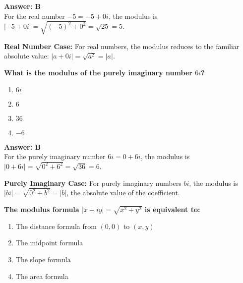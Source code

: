 \documentclass[12pt,a4paper]{article}
\begin{document}
\begin{answerstyle}
\textbf{Answer: B} \\
For the real number \( -5 = -5 + 0i \), the modulus is \( |-5 + 0i| = \sqrt{(-5)^2 + 0^2} = \sqrt{25} = 5 \).
\end{answerstyle}

\begin{conceptbox}
\textbf{Real Number Case:} For real numbers, the modulus reduces to the familiar absolute value: \( |a + 0i| = \sqrt{a^2} = |a| \).
\end{conceptbox}

\newpage
\begin{questiontitle}[MCQ 93]
\textbf{What is the modulus of the purely imaginary number \( 6i \)?}
\end{questiontitle}

\begin{partbox}[Options]
\begin{enumerate}[label=\Alph*.]
    \item \( 6i \)
    \item \( 6 \)
    \item \( 36 \)
    \item \( -6 \)
\end{enumerate}
\end{partbox}

\begin{answerstyle}
\textbf{Answer: B} \\
For the purely imaginary number \( 6i = 0 + 6i \), the modulus is \( |0 + 6i| = \sqrt{0^2 + 6^2} = \sqrt{36} = 6 \).
\end{answerstyle}

\begin{conceptbox}
\textbf{Purely Imaginary Case:} For purely imaginary numbers \( bi \), the modulus is \( |bi| = \sqrt{0^2 + b^2} = |b| \), the absolute value of the coefficient.
\end{conceptbox}

\newpage
\begin{questiontitle}[MCQ 94]
\textbf{The modulus formula \( |x + iy| = \sqrt{x^2 + y^2} \) is equivalent to:}
\end{questiontitle}

\begin{partbox}[Options]
\begin{enumerate}[label=\Alph*.]
    \item The distance formula from \( (0, 0) \) to \( (x, y) \)
    \item The midpoint formula
    \item The slope formula
    \item The area formula
\end{enumerate}
\end{partbox}
\end{document}
